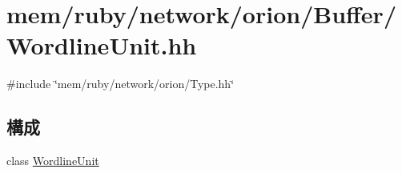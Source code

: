 \hypertarget{WordlineUnit_8hh}{
\section{mem/ruby/network/orion/Buffer/WordlineUnit.hh}
\label{WordlineUnit_8hh}
}
{\ttfamily \#include \char`\"{}mem/ruby/network/orion/Type.hh\char`\"{}}\par
\subsection*{構成}
\begin{DoxyCompactItemize}
\item 
class \hyperlink{classWordlineUnit}{WordlineUnit}
\end{DoxyCompactItemize}
